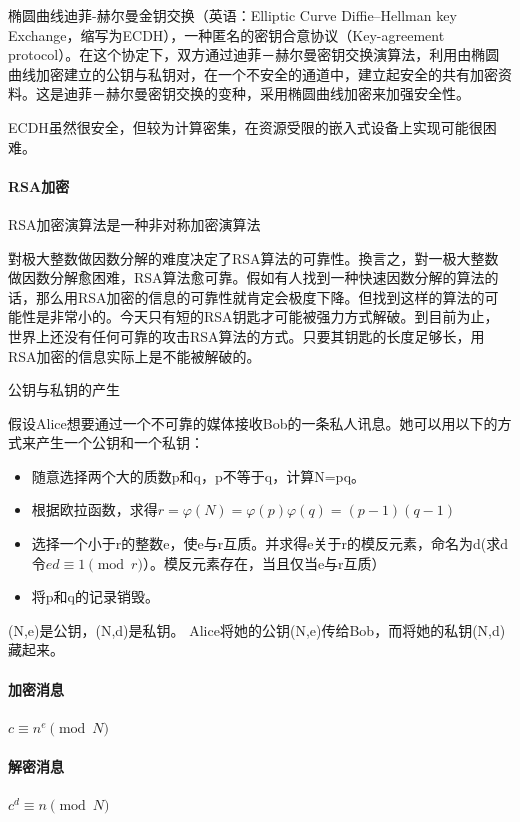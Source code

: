 \documentclass{ctexart}
\begin{document}
椭圆曲线迪菲-赫尔曼金钥交换（英语：Elliptic Curve Diffie–Hellman key Exchange，缩写为ECDH），一种匿名的密钥合意协议（Key-agreement protocol）。在这个协定下，双方通过迪菲－赫尔曼密钥交换演算法，利用由椭圆曲线加密建立的公钥与私钥对，在一个不安全的通道中，建立起安全的共有加密资料。这是迪菲－赫尔曼密钥交换的变种，采用椭圆曲线加密来加强安全性。

ECDH虽然很安全，但较为计算密集，在资源受限的嵌入式设备上实现可能很困难。

\paragraph{RSA加密}
RSA加密演算法是一种非对称加密演算法

對极大整数做因数分解的难度决定了RSA算法的可靠性。換言之，對一极大整数做因数分解愈困难，RSA算法愈可靠。假如有人找到一种快速因数分解的算法的话，那么用RSA加密的信息的可靠性就肯定会极度下降。但找到这样的算法的可能性是非常小的。今天只有短的RSA钥匙才可能被强力方式解破。到目前为止，世界上还没有任何可靠的攻击RSA算法的方式。只要其钥匙的长度足够长，用RSA加密的信息实际上是不能被解破的。

公钥与私钥的产生

假设Alice想要通过一个不可靠的媒体接收Bob的一条私人讯息。她可以用以下的方式来产生一个公钥和一个私钥：

\begin{itemize}
	\item 随意选择两个大的质数p和q，p不等于q，计算N=pq。
	\item 根据欧拉函数，求得$r=\varphi (N) = \varphi (p)\varphi (q)=(p-1)(q-1)$
	\item 选择一个小于r的整数e，使e与r互质。并求得e关于r的模反元素，命名为d(求d令${\displaystyle ed\equiv 1{\pmod{r}}}$）。模反元素存在，当且仅当e与r互质）
	\item 将p和q的记录销毁。
\end{itemize}

(N,e)是公钥，(N,d)是私钥。 Alice将她的公钥(N,e)传给Bob，而将她的私钥(N,d)藏起来。

\paragraph{加密消息}
${\displaystyle c\equiv n^{e}{\pmod {N}}}$
\paragraph{解密消息}
${\displaystyle c^d\equiv n{\pmod {N}}}$
\end{document}
